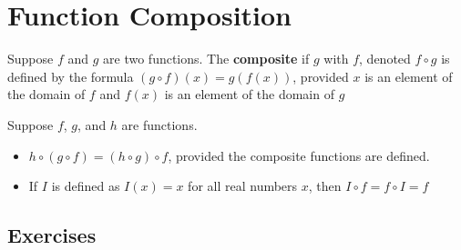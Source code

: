 \section{Function Composition}

\begin{definition}
    Suppose $f$ and $g$ are two functions. The \textbf{composite} if $g$ with $f$, denoted $f \circ g$ is defined by the formula $(g \circ f)(x) = g(f(x))$, provided $x$ is an element of the domain of $f$ and $f(x)$ is an element of the domain of $g$
\end{definition}

\begin{theorem}
    Suppose $f$, $g$, and $h$ are functions.
    \begin{itemize}
        \item $h \circ (g \circ f) = (h \circ g) \circ f$, provided the composite functions are defined.
        \item If $I$ is defined as $I(x) = x$ for all real numbers $x$, then $I \circ f = f \circ I = f$
    \end{itemize}
\end{theorem}

\subsection{Exercises}
